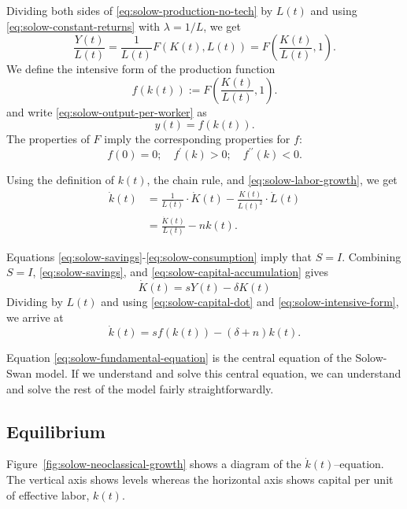 \documentclass[\topdir/lecture\_notes.tex]{subfiles}
\begin{document}
Dividing both sides of \eqref{eq:solow-production-no-tech} by \(L(t)\) and using \eqref{eq:solow-constant-returns} with \(\lambda = 1/L\), we get
\begin{equation}
  \frac{Y(t)}{L(t)} = \frac{1}{L(t)} F(K(t), L(t)) = F \left(\frac{K(t)}{L(t)}, 1\right). \label{eq:solow-output-per-worker}
\end{equation}
We define the intensive form of the production function
\begin{equation}
  f(k(t)) := F \left(\frac{K(t)}{L(t)}, 1\right). \label{eq:solow-intensive-production}
\end{equation}
and write \eqref{eq:solow-output-per-worker} as
\begin{equation}
  y(t) = f(k(t)). \label{eq:solow-intensive-form}
\end{equation}
The properties of \(F\) imply the corresponding properties for \(f\):
\begin{equation}
  f(0)=0 ; \quad f^{\prime}(k)>0 ; \quad f^{\prime \prime}(k)<0.
\end{equation}

Using the definition of \(k(t)\), the chain rule, and \eqref{eq:solow-labor-growth}, we get
\begin{align}
\dot{k}(t) & = \frac{1}{L(t)} \cdot \dot{K}(t)-\frac{K(t)}{L(t)^{2}} \cdot \dot{L}(t) \\
           & =\frac{\dot{K}(t)}{L(t)}-n k(t).
           \label{eq:solow-k-dot-derivation}
\end{align}

Equations \eqref{eq:solow-savings}-\eqref{eq:solow-consumption} imply that \(S=I\).
Combining \(S=I\), \eqref{eq:solow-savings}, and \eqref{eq:solow-capital-accumulation} gives
\begin{equation}
  \dot{K}(t)=s Y(t)-\delta K(t) \label{eq:solow-capital-dot}
\end{equation}
Dividing by \(L(t)\) and using \eqref{eq:solow-capital-dot} and \eqref{eq:solow-intensive-form}, we arrive at
\begin{equation}
  \dot{k}(t)=s f(k(t))-\left(\delta+n\right) k(t). \label{eq:solow-fundamental-equation}
\end{equation}

Equation \eqref{eq:solow-fundamental-equation} is the central equation of the Solow-Swan model.
If we understand and solve this central equation, we can understand and solve the rest of the model fairly straightforwardly.

\subsection{Equilibrium}
Figure~\ref{fig:solow-neoclassical-growth} shows a diagram of the \(\dot{k}(t)\)--equation.
The vertical axis shows levels whereas the horizontal axis shows capital per unit of effective labor, \(k(t)\).
\end{document}
